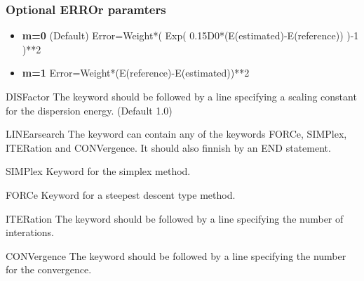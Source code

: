 \begin{keywordlist}
\subsubsection{Optional ERROr paramters}
\begin{itemize}
\itemsep 9pt plus 3pt minus 3pt
\item
{\bf m=0}
(Default) Error=Weight*( Exp( 0.15D0*(E(estimated)-E(reference)) )-1 )**2
\item
{\bf m=1}
Error=Weight*(E(reference)-E(estimated))**2
\end{itemize}
\item[DISFactor]
The keyword should be followed by a line specifying a scaling constant for the dispersion energy. (Default 1.0)
\item[LINEarsearch]
The keyword can contain any of the keywords FORCe, SIMPlex, ITERation and CONVergence. It should also finnish by an END statement.
\item[SIMPlex]
Keyword for the simplex method.
\item[FORCe]
Keyword for a steepest descent type method.
\item[ITERation]
The keyword should be followed by a line specifying the number of interations.
\item[CONVergence]
The keyword should be followed by a line specifying the number for the convergence.
\end{keywordlist}

